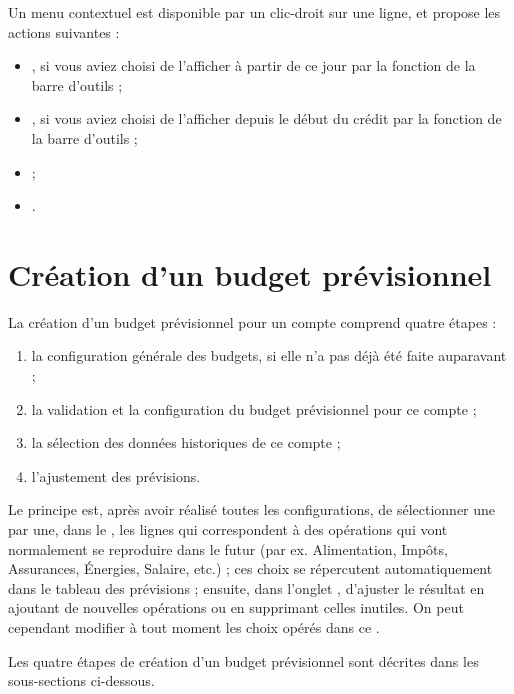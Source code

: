 Un menu contextuel est disponible par un clic-droit sur une ligne, et propose les actions suivantes :

\begin{itemize}
	 \item {}, si vous aviez choisi de l'afficher à partir de ce jour par la fonction   de la barre d'outils ;
	 \item {}, si vous aviez choisi de l'afficher depuis le début du crédit par la fonction  de la barre d'outils ;
	 \item {} ;
	 \item {}.
\end{itemize}


\section{Création d'un budget prévisionnel\label{budget-create}}


La création d'un budget prévisionnel pour un compte comprend quatre étapes :

\begin{enumerate}
	\item la configuration générale des budgets, si elle n'a pas déjà été faite auparavant ;
	\item la validation et la configuration du budget prévisionnel pour ce compte ;
	\item la sélection des données historiques de ce compte ;
	\item l'ajustement des prévisions.
\end{enumerate}

Le principe est, après avoir réalisé toutes les configurations, de sélectionner une par une, dans le , les lignes qui correspondent à des opérations qui vont normalement se reproduire dans le futur (par ex. Alimentation, Impôts, Assurances, Énergies, Salaire, etc.) ; ces choix se répercutent automatiquement dans le tableau des prévisions ; ensuite, dans l'onglet , d'ajuster le résultat en ajoutant de nouvelles opérations ou en supprimant celles inutiles. On peut cependant modifier à tout moment les choix opérés dans ce .

Les quatre étapes de création d'un budget prévisionnel sont décrites dans les sous-sections ci-dessous.


